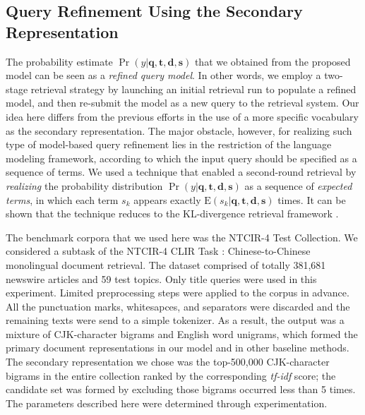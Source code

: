 \subsection{Query Refinement Using the Secondary
Representation}\label{s:query-modeling}

The probability estimate $\Pr(y|\mathbf{q}, \mathbf{t}, \mathbf{d},
\mathbf{s})$ that we obtained from the proposed model can be seen as a
\emph{refined query model}.  In other words, we employ a two-stage retrieval
strategy by launching an initial retrieval run to populate a refined model, and
then re-submit the model as a new query to the retrieval system.  Our idea here
differs from the previous efforts \cite{lavrenko2001relevance} in the use of a
more specific vocabulary as the secondary representation.  The major obstacle,
however, {for} realizing such type of model-based query refinement lies in the
restriction of the language modeling framework, according to which the input
query should be specified as a sequence of terms.  We used a technique
that enabled a second-round retrieval by \emph{realizing} the probability
distribution $\Pr(y|\mathbf{q}, \mathbf{t}, \mathbf{d}, \mathbf{s})$ as a
sequence of \emph{expected terms}, in which each term $s_k$ appears exactly
$\mathrm{E}(s_k|\mathbf{q}, \mathbf{t}, \mathbf{d}, \mathbf{s})$ times.  It can
be shown that the technique reduces to the KL-divergence retrieval
framework \cite{zhai2001language}. 

The benchmark corpora that we used here was the NTCIR-4 Test Collection.  We
considered a subtask of the NTCIR-4 CLIR Task \cite{kishida2004overview}:
Chinese-to-Chinese monolingual document retrieval.  The dataset comprised of
totally 381,681 newswire articles and 59 test topics.  Only title queries were
used in this experiment.  Limited preprocessing steps were applied to the
corpus in advance.  All the punctuation marks, whitesapces, and separators were
discarded and the remaining texts were send to a simple tokenizer.  As a
result, the output was a mixture of CJK-character bigrams and English
word unigrams, which formed the primary document representations in our model
and in other baseline methods.  The secondary representation we chose was the
top-500,000 CJK-character bigrams in the entire collection ranked by the
corresponding \emph{tf-idf} score; the candidate set was formed by excluding
those bigrams occurred less than 5 times.  The parameters described here were
determined through experimentation.

